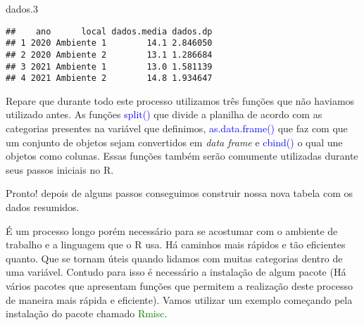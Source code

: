 \documentclass[14pt,titlepage, oneside, openany, a4paper]{book}
\newenvironment{Shaded}{\begin{snugshade}}{\end{snugshade}}
\newcommand{\FloatTok}[1]{\textcolor[rgb]{0.00,0.00,0.81}{#1}}
\newcommand{\KeywordTok}[1]{\textcolor[rgb]{0.13,0.29,0.53}{\textbf{#1}}}
\newcommand{\NormalTok}[1]{#1}
\newcommand{\OperatorTok}[1]{\textcolor[rgb]{0.81,0.36,0.00}{\textbf{#1}}}
\newcommand{\StringTok}[1]{\textcolor[rgb]{0.31,0.60,0.02}{#1}}
\begin{document}
\begin{Shaded}
\end{Shaded}

\begin{Shaded}
\begin{Highlighting}[]
\NormalTok{dados}\FloatTok{.3}
\end{Highlighting}
\end{Shaded}

\begin{verbatim}
##    ano      local dados.media dados.dp
## 1 2020 Ambiente 1        14.1 2.846050
## 2 2020 Ambiente 2        13.1 1.286684
## 3 2021 Ambiente 1        13.0 1.581139
## 4 2021 Ambiente 2        14.8 1.934647
\end{verbatim}

Repare que durante todo este processo utilizamos três funções que não haviamos utilizado antes. As funções \textcolor{blue}{split()} que divide a planilha de acordo com as categorias presentes na variável que definimos, \textcolor{blue}{as.data.frame()} que faz com que um conjunto de objetos sejam convertidos em \emph{data frame} e \textcolor{blue}{cbind()} o qual une objetos como colunas. Essas funções também serão comumente utilizadas durante seus passos iniciais no R.

Pronto! depois de alguns passos conseguimos construir nossa nova tabela com os dados resumidos.

É um processo longo porém necessário para se acostumar com o ambiente de trabalho e a linguagem que o R usa. Há caminhos mais rápidos e tão eficientes quanto. Que se tornam úteis quando lidamos com muitas categorias dentro de uma variável. Contudo para isso é necessário a instalação de algum pacote (Há vários pacotes que apresentam funções que permitem a realização deste processo de maneira mais rápida e eficiente). Vamos utilizar um exemplo começando pela instalação do pacote chamado \textcolor{green}{Rmisc}.
\end{document}
